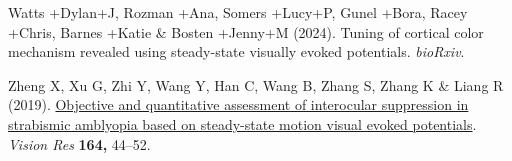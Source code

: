 \documentclass[
  letterpaper,
  DIV=11,
  numbers=noendperiod]{scrartcl}
\newlength{\cslhangindent}
\newenvironment{CSLReferences}[2] %
 {\begin{list}{}{%
  \setlength{\itemindent}{0pt}
  \setlength{\leftmargin}{0pt}
  \setlength{\parsep}{0pt}
  \ifodd #1
   \setlength{\leftmargin}{\cslhangindent}
   \setlength{\itemindent}{-1\cslhangindent}
  \fi
  \setlength{\itemsep}{#2\baselineskip}}}
 {\end{list}}
\begin{document}
\begin{CSLReferences}{1}{1}
Watts +Dylan+J, Rozman +Ana, Somers +Lucy+P, Gunel +Bora, Racey +Chris,
Barnes +Katie \& Bosten +Jenny+M (2024). Tuning of cortical color
mechanism revealed using steady-state visually evoked potentials.
\emph{bioRxiv}.

Zheng X, Xu G, Zhi Y, Wang Y, Han C, Wang B, Zhang S, Zhang K \& Liang R
(2019). \href{https://doi.org/10.1016/j.visres.2019.07.003}{Objective
and quantitative assessment of interocular suppression in strabismic
amblyopia based on steady-state motion visual evoked potentials}.
\emph{Vision Res} \textbf{164,} 44--52.

\end{CSLReferences}
\end{document}
